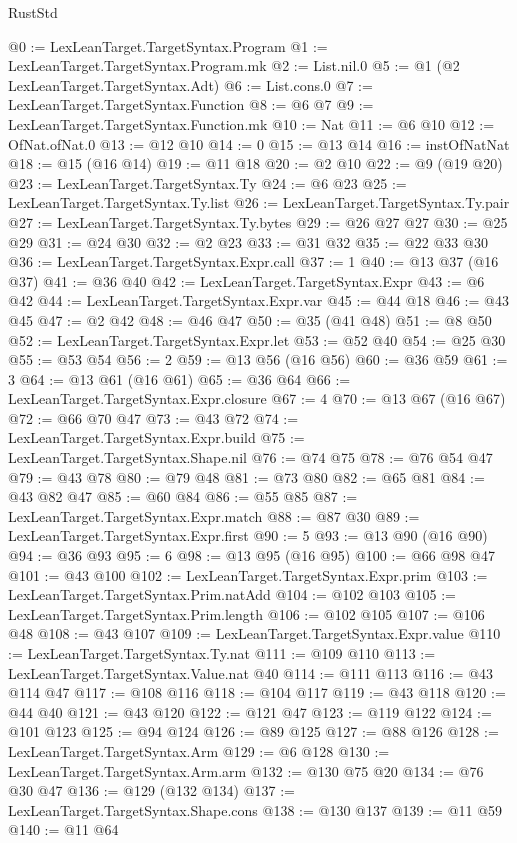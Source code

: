 \begin{lexlean}{RustStd}
\begin{coremodule}
{\begin{coremodule}
{{{{{{{{{{{{{{{{{{{{{{{{{{@0 := LexLeanTarget.TargetSyntax.Program
@1 := LexLeanTarget.TargetSyntax.Program.mk
@2 := List.nil.{0}
@5 := @1 (@2 LexLeanTarget.TargetSyntax.Adt)
@6 := List.cons.{0}
@7 := LexLeanTarget.TargetSyntax.Function
@8 := @6 @7
@9 := LexLeanTarget.TargetSyntax.Function.mk
@10 := Nat
@11 := @6 @10
@12 := OfNat.ofNat.{0}
@13 := @12 @10
@14 := 0
@15 := @13 @14
@16 := instOfNatNat
@18 := @15 (@16 @14)
@19 := @11 @18
@20 := @2 @10
@22 := @9 (@19 @20)
@23 := LexLeanTarget.TargetSyntax.Ty
@24 := @6 @23
@25 := LexLeanTarget.TargetSyntax.Ty.list
@26 := LexLeanTarget.TargetSyntax.Ty.pair
@27 := LexLeanTarget.TargetSyntax.Ty.bytes
@29 := @26 @27 @27
@30 := @25 @29
@31 := @24 @30
@32 := @2 @23
@33 := @31 @32
@35 := @22 @33 @30
@36 := LexLeanTarget.TargetSyntax.Expr.call
@37 := 1
@40 := @13 @37 (@16 @37)
@41 := @36 @40
@42 := LexLeanTarget.TargetSyntax.Expr
@43 := @6 @42
@44 := LexLeanTarget.TargetSyntax.Expr.var
@45 := @44 @18
@46 := @43 @45
@47 := @2 @42
@48 := @46 @47
@50 := @35 (@41 @48)
@51 := @8 @50
@52 := LexLeanTarget.TargetSyntax.Expr.let
@53 := @52 @40
@54 := @25 @30
@55 := @53 @54
@56 := 2
@59 := @13 @56 (@16 @56)
@60 := @36 @59
@61 := 3
@64 := @13 @61 (@16 @61)
@65 := @36 @64
@66 := LexLeanTarget.TargetSyntax.Expr.closure
@67 := 4
@70 := @13 @67 (@16 @67)
@72 := @66 @70 @47
@73 := @43 @72
@74 := LexLeanTarget.TargetSyntax.Expr.build
@75 := LexLeanTarget.TargetSyntax.Shape.nil
@76 := @74 @75
@78 := @76 @54 @47
@79 := @43 @78
@80 := @79 @48
@81 := @73 @80
@82 := @65 @81
@84 := @43 @82 @47
@85 := @60 @84
@86 := @55 @85
@87 := LexLeanTarget.TargetSyntax.Expr.match
@88 := @87 @30
@89 := LexLeanTarget.TargetSyntax.Expr.first
@90 := 5
@93 := @13 @90 (@16 @90)
@94 := @36 @93
@95 := 6
@98 := @13 @95 (@16 @95)
@100 := @66 @98 @47
@101 := @43 @100
@102 := LexLeanTarget.TargetSyntax.Expr.prim
@103 := LexLeanTarget.TargetSyntax.Prim.natAdd
@104 := @102 @103
@105 := LexLeanTarget.TargetSyntax.Prim.length
@106 := @102 @105
@107 := @106 @48
@108 := @43 @107
@109 := LexLeanTarget.TargetSyntax.Expr.value
@110 := LexLeanTarget.TargetSyntax.Ty.nat
@111 := @109 @110
@113 := LexLeanTarget.TargetSyntax.Value.nat @40
@114 := @111 @113
@116 := @43 @114 @47
@117 := @108 @116
@118 := @104 @117
@119 := @43 @118
@120 := @44 @40
@121 := @43 @120
@122 := @121 @47
@123 := @119 @122
@124 := @101 @123
@125 := @94 @124
@126 := @89 @125
@127 := @88 @126
@128 := LexLeanTarget.TargetSyntax.Arm
@129 := @6 @128
@130 := LexLeanTarget.TargetSyntax.Arm.arm
@132 := @130 @75 @20
@134 := @76 @30 @47
@136 := @129 (@132 @134)
@137 := LexLeanTarget.TargetSyntax.Shape.cons
@138 := @130 @137
@139 := @11 @59
@140 := @11 @64
}}}}}}}}}}}}}}}}}}}}}}}}}}
\end{coremodule}}
\end{coremodule}
\end{lexlean}
